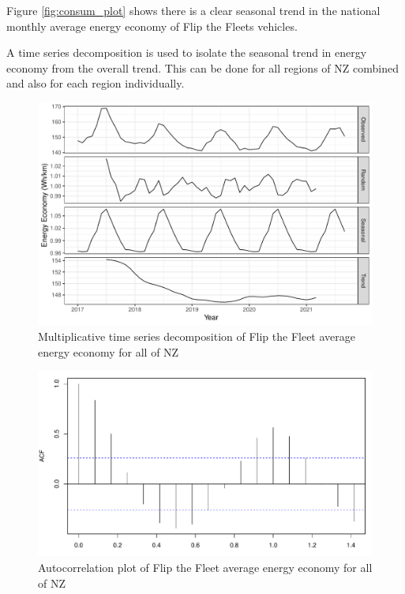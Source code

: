 \documentclass[
]{article}
\begin{document}
Figure \ref{fig:consum_plot} shows there is a clear seasonal trend in
the national monthly average energy economy of Flip the Fleets vehicles.

A time series decomposition is used to isolate the seasonal trend in
energy economy from the overall trend. This can be done for all regions
of NZ combined and also for each region individually.

\begin{figure}
\centering
\includegraphics{final_report_files/figure-latex/consum_decomp_plot-1.pdf}
\caption{Multiplicative time series decomposition of Flip the Fleet
average energy economy for all of NZ\label{fig:consum_decomp_plot}}
\end{figure}

\begin{figure}
\centering
\includegraphics{final_report_files/figure-latex/acf_consum-1.pdf}
\caption{Autocorrelation plot of Flip the Fleet average energy economy
for all of NZ\label{fig:acf_consum}}
\end{figure}
\end{document}
